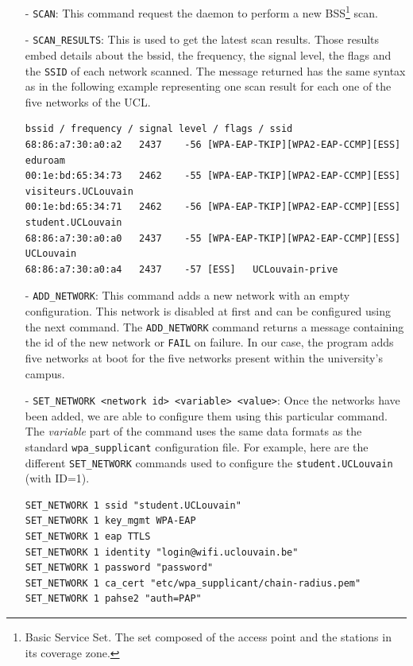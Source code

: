 \begin{itemize}
	\item[-] \texttt{SCAN}: This command request the daemon to perform a new BSS\footnote{Basic Service Set. The set composed of the access point and the stations in its coverage zone.} scan.

	\item[-] \texttt{SCAN\_RESULTS}: This is used to get the latest scan results. Those results embed details about the bssid, the frequency, the signal level, the flags and the \texttt{SSID} of each network scanned. The message returned has the same syntax as in the following example representing one scan result for each one of the five networks of the UCL.\\

\begin{lstlisting}[frame=single,breaklines=true,caption={Scan results message example}]
bssid / frequency / signal level / flags / ssid
68:86:a7:30:a0:a2	2437	-56	[WPA-EAP-TKIP][WPA2-EAP-CCMP][ESS]	eduroam
00:1e:bd:65:34:73	2462	-55	[WPA-EAP-TKIP][WPA2-EAP-CCMP][ESS]	visiteurs.UCLouvain
00:1e:bd:65:34:71 	2462	-56	[WPA-EAP-TKIP][WPA2-EAP-CCMP][ESS]	student.UCLouvain
68:86:a7:30:a0:a0 	2437	-55	[WPA-EAP-TKIP][WPA2-EAP-CCMP][ESS]	UCLouvain
68:86:a7:30:a0:a4 	2437	-57	[ESS]	UCLouvain-prive
\end{lstlisting}

	\item[-] \texttt{ADD\_NETWORK}: This command adds a new network with an empty configuration. This network is disabled at first and can be configured using the next command. The \texttt{ADD\_NETWORK} command returns a message containing the id of the new network or \texttt{FAIL} on failure. In our case, the program adds five networks at boot for the five networks present within the university's campus.

	\item[-] \texttt{SET\_NETWORK <network id> <variable> <value>}: Once the networks have been added, we are able to configure them using this particular command. The \textit{variable} part of the command uses the same data formats as the standard \texttt{wpa\_supplicant} configuration file. For example, here are the different \texttt{SET\_NETWORK} commands used to configure the \texttt{student.UCLouvain} (with ID=1).\\

\begin{lstlisting}[frame=single,breaklines=true,caption={Configuration of the \texttt{student.UCLouvain} network}]
SET_NETWORK 1 ssid "student.UCLouvain"
SET_NETWORK 1 key_mgmt WPA-EAP
SET_NETWORK 1 eap TTLS
SET_NETWORK 1 identity "login@wifi.uclouvain.be"
SET_NETWORK 1 password "password"
SET_NETWORK 1 ca_cert "etc/wpa_supplicant/chain-radius.pem"
SET_NETWORK 1 pahse2 "auth=PAP"
\end{lstlisting}


\end{itemize}
